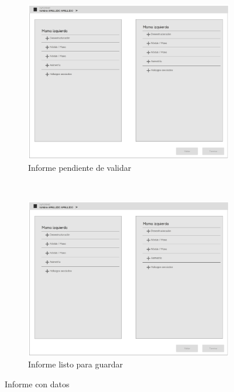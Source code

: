\begin{figure}[ht]
    \centering
        \begin{subfigure}[b]{0.5\textwidth}
                \centering
                \includegraphics[page=2,scale=0.25]{./imgs/mockup/mockup.pdf}
                \caption{Informe pendiente de validar}
                \label{fig:mockup:validated}
        \end{subfigure}%
        ~ 
        \begin{subfigure}[b]{0.5\textwidth}
                \centering
                \includegraphics[page=3,scale=0.25]{./imgs/mockup/mockup.pdf}
                \caption{Informe listo para guardar}
                \label{fig:mockup:finish}
        \end{subfigure}
    \caption{Informe con datos}\label{fig:end}
\end{figure}

